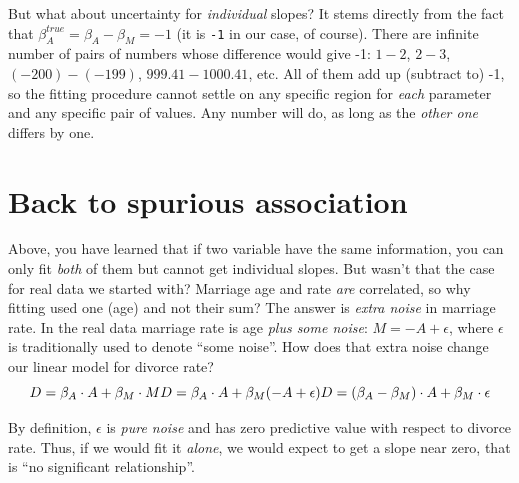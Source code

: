 \documentclass[
]{book}
\begin{document}
But what about uncertainty for \emph{individual} slopes? It stems directly from the fact that \(\beta_A^{true} = \beta_A - \beta_M = -1\) (it is \texttt{-1} in our case, of course). There are infinite number of pairs of numbers whose difference would give -1: \(1-2\), \(2-3\), \((-200)-(-199)\), \(999.41-1000.41\), etc. All of them add up (subtract to) -1, so the fitting procedure cannot settle on any specific region for \emph{each} parameter and any specific pair of values. Any number will do, as long as the \emph{other one} differs by one.

\hypertarget{back-to-spurious-association}{%
\section{Back to spurious association}\label{back-to-spurious-association}}

Above, you have learned that if two variable have the same information, you can only fit \emph{both} of them but cannot get individual slopes. But wasn't that the case for real data we started with? Marriage age and rate \emph{are} correlated, so why fitting used one (age) and not their sum? The answer is \emph{extra noise} in marriage rate. In the real data marriage rate is age \emph{plus some noise}: \(M = -A + \epsilon\), where \(\epsilon\) is traditionally used to denote ``some noise''. How does that extra noise change our linear model for divorce rate?
\[D = \beta_A \cdot A + \beta_M \cdot M \\
D = \beta_A \cdot A + \beta_M (- A + \epsilon) \\
D = (\beta_A  - \beta_M ) \cdot A + \beta_M \cdot \epsilon\]

By definition, \(\epsilon\) is \emph{pure noise} and has zero predictive value with respect to divorce rate. Thus, if we would fit it \emph{alone}, we would expect to get a slope near zero, that is ``no significant relationship''.
\end{document}
